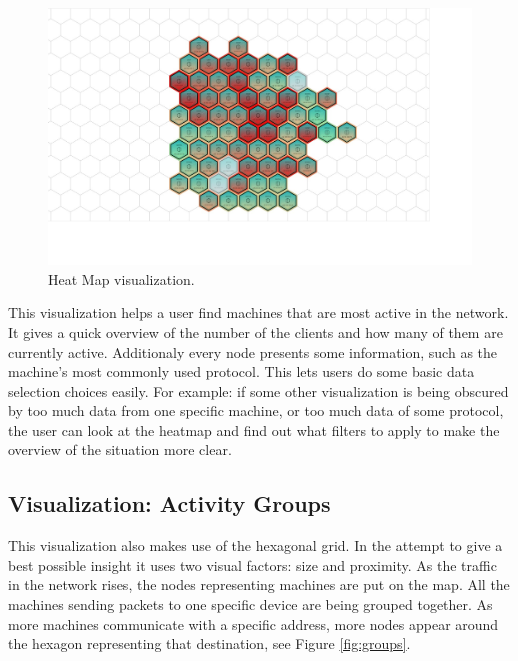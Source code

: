\begin{figure}[htb]
   \centering
   \includegraphics[width=\linewidth]{materials/heat-map.jpg}
   \caption[Heat Map]{\label{fig:heatmap}
         Heat Map visualization.}
\end{figure}

This visualization helps a user find machines that are most active in the network.
It gives a quick overview of the number of the clients and how many of them are currently active.
Additionaly every node presents some information, such as the machine's most commonly used protocol.
This lets users do some basic data selection choices easily. For example: if some other visualization
is being obscured by too much data from one specific machine, or too much data of some protocol,
the user can look at the heatmap and find out what filters to apply to make the overview of the
situation more clear.

\subsection{Visualization: Activity Groups}
%
This visualization also makes use of the hexagonal grid. In the attempt to give a best possible
insight it uses two visual factors: size and proximity. As the traffic in the network rises, the
nodes representing machines are put on the map. All the machines sending packets to one specific
device are being grouped together. As more machines communicate with a specific address, more nodes
appear around the hexagon representing that destination, see Figure \ref{fig:groups}.

